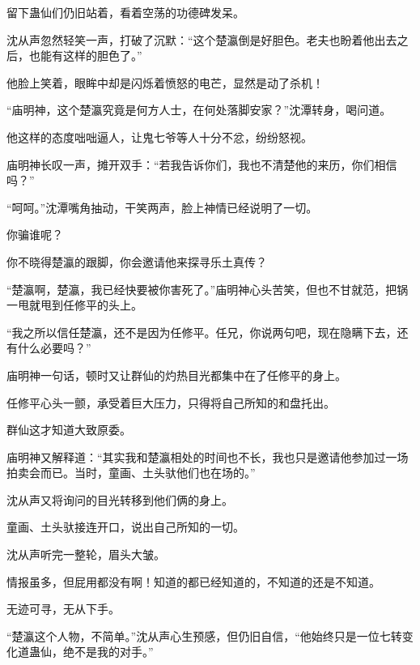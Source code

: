 \begin{this_body}
留下蛊仙们仍旧站着，看着空荡的功德碑发呆。

沈从声忽然轻笑一声，打破了沉默：“这个楚瀛倒是好胆色。老夫也盼着他出去之后，也能有这样的胆色了。”

他脸上笑着，眼眸中却是闪烁着愤怒的电芒，显然是动了杀机！

“庙明神，这个楚瀛究竟是何方人士，在何处落脚安家？”沈潭转身，喝问道。

他这样的态度咄咄逼人，让鬼七爷等人十分不忿，纷纷怒视。

庙明神长叹一声，摊开双手：“若我告诉你们，我也不清楚他的来历，你们相信吗？”

“呵呵。”沈潭嘴角抽动，干笑两声，脸上神情已经说明了一切。

你骗谁呢？

你不晓得楚瀛的跟脚，你会邀请他来探寻乐土真传？

“楚瀛啊，楚瀛，我已经快要被你害死了。”庙明神心头苦笑，但也不甘就范，把锅一甩就甩到任修平的头上。

“我之所以信任楚瀛，还不是因为任修平。任兄，你说两句吧，现在隐瞒下去，还有什么必要吗？”

庙明神一句话，顿时又让群仙的灼热目光都集中在了任修平的身上。

任修平心头一颤，承受着巨大压力，只得将自己所知的和盘托出。

群仙这才知道大致原委。

庙明神又解释道：“其实我和楚瀛相处的时间也不长，我也只是邀请他参加过一场拍卖会而已。当时，童画、土头驮他们也在场的。”

沈从声又将询问的目光转移到他们俩的身上。

童画、土头驮接连开口，说出自己所知的一切。

沈从声听完一整轮，眉头大皱。

情报虽多，但屁用都没有啊！知道的都已经知道的，不知道的还是不知道。

无迹可寻，无从下手。

“楚瀛这个人物，不简单。”沈从声心生预感，但仍旧自信，“他始终只是一位七转变化道蛊仙，绝不是我的对手。”

\end{this_body}


